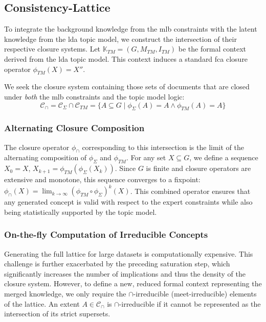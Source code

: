 \subsection{Consistency-Lattice}
\label{sec:integrated_lattice_computation}
To integrate the background knowledge from the \ac{mlb} constraints with the latent knowledge from the \ac{lda} topic model, we construct the intersection of their respective closure systems.
Let $\mathbb{K}_{TM} = (G, M_{TM}, I_{TM})$ be the formal context derived from the \ac{lda} topic model. 
This context induces a standard \ac{fca} closure operator $\phi_{TM}(X) = X''$.

We seek the closure system containing those sets of documents that are closed under \emph{both} the \ac{mlb} constraints and the topic model logic:
\begin{equation}
    \mathcal{C}_{\cap} = \mathcal{C}_{\Sigma} \cap \mathcal{C}_{TM} = \{ A \subseteq G \mid \phi_{\Sigma}(A) = A \land \phi_{TM}(A) = A \}
\end{equation}

\subsubsection{Alternating Closure Composition}
The closure operator $\phi_\cap$ corresponding to this intersection is the limit of the alternating composition of $\phi_\Sigma$ and $\phi_{TM}$. For any set $X \subseteq G$, we define a sequence $X_0 = X$, $X_{k+1} = \phi_{TM}(\phi_\Sigma(X_k))$. Since $G$ is finite and closure operators are extensive and monotone, this sequence converges to a fixpoint: $\phi_\cap(X) = \lim_{k\to\infty} (\phi_{TM} \circ \phi_\Sigma)^k(X)$. This combined operator ensures that any generated concept is valid with respect to the expert constraints while also being statistically supported by the topic model.

\subsubsection{On-the-fly Computation of Irreducible Concepts}
Generating the full lattice for large datasets is computationally expensive. This challenge is further exacerbated by the preceding saturation step, which significantly increases the number of implications and thus the density of the closure system. However, to define a new, reduced formal context representing the merged knowledge, we only require the $\cap$-irreducible (meet-irreducible) elements of the lattice. An extent $A \in \mathcal{C}_\cap$ is $\cap$-irreducible if it cannot be represented as the intersection of its strict supersets.

